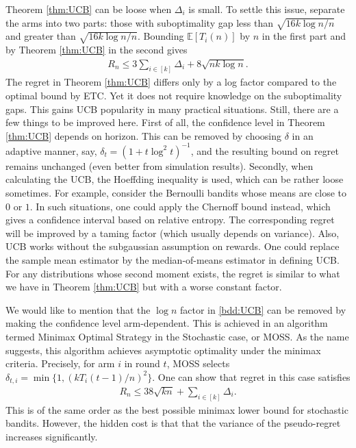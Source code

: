 \documentclass[10pt,a4paper]{amsart}
\numberwithin{equation}{section}
\theoremstyle{plain}
\theoremstyle{definition}
\def\E{{\mathbb E}}
\begin{document}
Theorem \ref{thm:UCB} can be loose when $\Delta_i$ is small. To settle this issue, separate the  arms into two parts: those with suboptimality gap less than $\sqrt{16k\log n/n}$ and greater than $\sqrt{16k\log n/n}$. Bounding $\E[T_i(n)]$ by $n$ in the first part and by Theorem \ref{thm:UCB} in the second gives
\begin{align}
R_n\leq 3\sum_{i\in [k]}\Delta_i + 8\sqrt{nk\log n}. \label{bdd:UCB}
\end{align} 
The regret in Theorem \ref{thm:UCB} differs only by a log factor compared to the optimal bound by ETC. Yet it does not require knowledge on the suboptimality gaps. This gains UCB popularity in many practical situations. Still, there are a few things to be improved here. First of all, the confidence level in Theorem \ref{thm:UCB} depends on horizon. This can be removed by choosing $\delta$ in an adaptive manner, say, $\delta_t = (1+t\log^2 t)^{-1}$, and the resulting bound on regret remains unchanged (even better from simulation results). Secondly, when calculating the UCB, the Hoeffding inequality is used, which can be rather loose sometimes. For example, consider the Bernoulli bandits whose means are close to $0$ or $1$. In such situations, one could apply the Chernoff bound instead, which gives a confidence interval based on relative entropy. The corresponding regret will be improved by a taming factor (which usually depends on variance). Also, UCB works without the subgaussian assumption on rewards. One could replace the sample mean estimator by the median-of-means estimator in defining UCB. For any distributions whose second moment exists, the regret is similar to what we have in Theorem \ref{thm:UCB} but with a worse constant factor. 

We would like to mention that the $\log n$ factor in \eqref{bdd:UCB} can be removed by making the confidence level arm-dependent. This is achieved in an algorithm termed Minimax Optimal Strategy in the Stochastic case, or MOSS.  As the name suggests, this algorithm achieves asymptotic optimality under the minimax criteria. Precisely, for arm $i$ in round $t$,  MOSS selects $\delta_{t, i}=\min\{1, (kT_i(t-1)/n)^2\}$. One can show that regret in this case satisfies
\begin{align*}
R_n\leq 38\sqrt{kn}+\sum_{i\in [k]}\Delta_i. 
\end{align*}
This is of the same order as the best possible minimax lower bound for stochastic bandits. However, the hidden cost is that that the variance of the pseudo-regret increases significantly.
\end{document}
